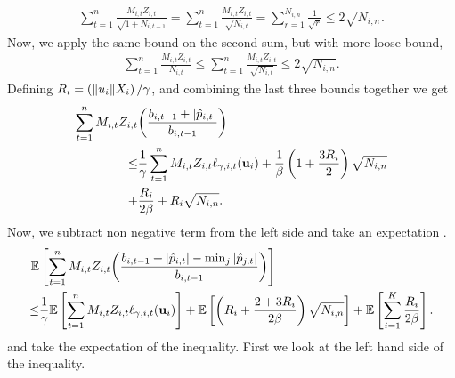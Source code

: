 {\begin{equation*}
\begin{split}
\sum_{t=1}^{n}{\frac{M_{i,t}Z_{i,t}}{\sqrt{1+N_{i,t-1}}}}
=\sum_{t=1}^{n}{\frac{M_{i,t}Z_{i,t}}{\sqrt{N_{i,t}}}}
=\sum_{r=1}^{N_{i,n}}{\frac{1}{\sqrt{r}}} 
\le 2\sqrt{N_{i,n}}.
\end{split}
\end{equation*}
Now, we apply the same bound on the second sum, but with more loose bound, \begin{equation*}
\begin{split}
\sum_{t=1}^{n}{\frac{M_{i,t}Z_{i,t}}{N_{i,t}}}
\le\sum_{t=1}^{n}{\frac{M_{i,t}Z_{i,t}}{\sqrt{N_{i,t}}}} 
\le 2\sqrt{N_{i,n}}. 
\end{split}
\end{equation*}
Defining $R_i=\left({\Vert u_i\Vert X_i}\right)/{\gamma}$, and combining the last three bounds together we get
\begin{equation*}
\begin{split}
\sum_{t=1}^{n}M_{i,t}Z_{i,t}&{\left({\frac{b_{i,t-1} +\left\vert{\hat{p}_{i,t}}\right\vert}{b_{i,t-1}}}\right)}\\
\le &\frac{1}{\gamma}\sum_{t=1}^{n}{M_{i,t}Z_{i,t}}\ell_{\gamma,i,t}(\mathbf{u}_i)
+\frac{1}{\beta}\left({1+\frac{3R_{i}}{2}}\right)\sqrt{N_{i,n}}
\\
+&\frac{R_i}{2\beta}+R_{i}\sqrt{N_{i,n}}.
\end{split}
\end{equation*}
Now, we subtract non negative term from the left side and take an  expectation .
\begin{equation*}
\begin{split}  
\mathbb{E}&\left[{\sum_{t=1}^{n}M_{i,t}Z_{i,t}{\left({\frac{b_{i,t-1} +\left\vert{\hat{p}_{i,t}}\right\vert-\min_j\left\vert{\hat{p}_{j,t}}\right\vert}{b_{i,t-1}}}\right)}}\right]\\
\le &\frac{1}{\gamma}\mathbb{E}\left[{\sum_{t=1}^{n}{M_{i,t}Z_{i,t}}\ell_{\gamma,i,t}(\mathbf{u}_i)}\right]
+\mathbb{E}\left[{\left({R_{i}+\frac{2+3R_{i}}{2\beta}}\right)\sqrt{N_{i,n}}}\right]
+\mathbb{E}\left[{\sum_{i=1}^{K}\frac{R_i}{2\beta}}\right].
\end{split}
\end{equation*}
and take the expectation of the inequality. First we look at the left hand side of the inequality.

}

